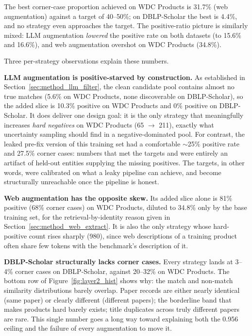 \documentclass[a4paper,oneside,bibliography=totoc]{scrbook}
\begin{document}
The best corner-case proportion achieved on WDC Products is 31.7\% (web augmentation) against a target of 40--50\%; on DBLP-Scholar the best is 4.4\%, and no strategy even approaches the target. The positive-ratio picture is similarly mixed: LLM augmentation \emph{lowered} the positive rate on both datasets (to 15.6\% and 16.6\%), and web augmentation overshot on WDC Products (34.8\%).

Three per-strategy observations explain these numbers.

\textbf{LLM augmentation is positive-starved by construction.} As established in Section~\ref{sec:method_llm_filter}, the clean candidate pool contains almost no true matches (5.6\% on WDC Products, none discoverable on DBLP-Scholar), so the added slice is 10.3\% positive on WDC Products and 0\% positive on DBLP-Scholar. It does deliver one design goal: it is the only strategy that meaningfully increases \emph{hard negatives} on WDC Products (65 $\rightarrow$ 211), exactly what uncertainty sampling should find in a negative-dominated pool. For contrast, the leaked pre-fix version of this training set had a comfortable $\sim$25\% positive rate and 27.5\% corner cases: numbers that met the targets and were entirely an artifact of held-out entities supplying the missing positives. The targets, in other words, were calibrated on what a leaky pipeline can achieve, and become structurally unreachable once the pipeline is honest.

\textbf{Web augmentation has the opposite skew.} Its added slice alone is 81\% positive (68\% corner cases) on WDC Products, diluted to 34.8\% only by the base training set, for the retrieval-by-identity reason given in Section~\ref{sec:method_web_extract}. It is also the only strategy whose hard-positive count rises sharply (980), since web descriptions of a training product often share few tokens with the benchmark's description of it.

\textbf{DBLP-Scholar structurally lacks corner cases.} Every strategy lands at 3--4\% corner cases on DBLP-Scholar, against 20--32\% on WDC Products. The bottom row of Figure~\ref{fig:layer2_hist} shows why: the match and non-match similarity distributions barely overlap. Paper records are either nearly identical (same paper) or clearly different (different papers); the borderline band that makes products hard barely exists; title duplicates across truly different papers are rare. This single number goes a long way toward explaining both the 0.956 ceiling and the failure of every augmentation to move it.
\end{document}
